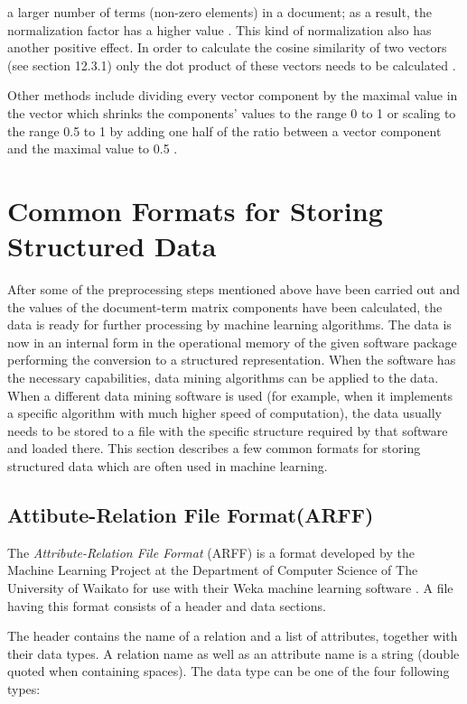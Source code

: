 \hspace{-1.5em}a larger number of terms (non-zero elements) in a document; as a result, the
normalization factor has a higher value \cite{ref252}. This kind of normalization also has
another positive effect. In order to calculate the cosine similarity of two vectors (see section 12.3.1) only the dot product of these vectors needs to be calculated
\cite{ref185}.

Other methods include dividing every vector component by the maximal
value in the vector which shrinks the components’ values to the range 0 to 1
\cite{ref216} or scaling to the range 0.5 to 1 by adding one half of the ratio between a
vector component and the maximal value to 0.5 \cite{ref141}.

\section{Common Formats for Storing Structured Data}

After some of the preprocessing steps mentioned above have been carried out
and the values of the document-term matrix components have been calculated,
the data is ready for further processing by machine learning algorithms. The data
is now in an internal form in the operational memory of the given software package performing the conversion to a structured representation. When the software
has the necessary capabilities, data mining algorithms can be applied to the data.
When a different data mining software is used (for example, when it implements
a specific algorithm with much higher speed of computation), the data usually
needs to be stored to a file with the specific structure required by that software
and loaded there. This section describes a few common formats for storing structured data which are often used in machine learning.

\subsection{Attibute-Relation File Format(ARFF)}

The \textit{Attribute-Relation File Format} (ARFF) is a format developed by the Machine Learning Project at the Department of Computer Science of The University of Waikato for use with their Weka machine learning software \cite{ref280}. A file
having this format consists of a header and data sections.

The header contains the name of a relation and a list of attributes, together
with their data types. A relation name as well as an attribute name is a string
(double quoted when containing spaces). The data type can be one of the four
following types:


